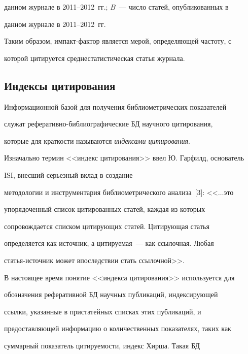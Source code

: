 данном журнале в 2011--2012~гг.; $B$~--- число статей, опубликованных в


данном журнале в 2011--2012~гг.





  Таким образом, импакт-фактор является мерой, определяющей частоту, с


которой цитируется среднестатистическая статья журнала.





\subsection{Индексы цитирования}





  Информационной базой для получения библиометрических показателей


служат реферативно-библиографические БД научного цитирования,


которые для краткости называются \textit{индексами цитирования}.





  Изначально термин <<индекс цитирования>> ввел Ю. Гарфилд, основатель


ISI, внесший серьезный вклад в создание


методологии и инструментария библиометрического анализа~[3]: <<$\ldots$это


упорядоченный список цитированных статей, каждая из которых


сопровождается списком цитирующих статей. Цитирующая статья


определяется как источник, а цитируемая~--- как ссылочная. Любая


статья-ис\-точ\-ник может впоследствии стать ссылочной>>.





  В настоящее время понятие <<индекса цитирования>> используется для


обозначения реферативной БД научных публикаций, индексирующей


ссылки, указанные в пристатейных списках этих публикаций, и


предоставляющей информацию о количественных показателях, таких как


суммарный показатель цитируемости, индекс Хирша. Такая БД


